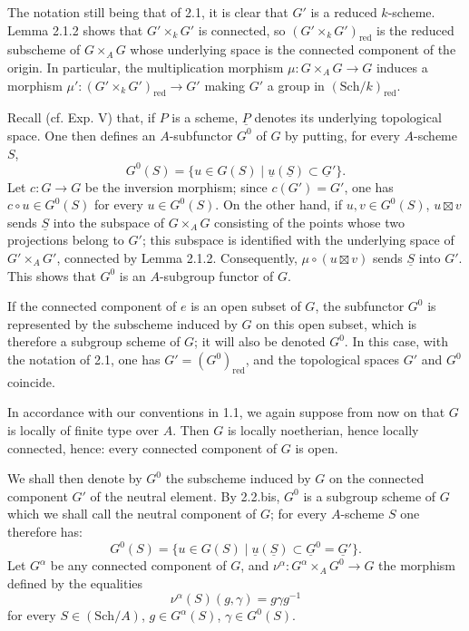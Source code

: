 The notation still being that of 2.1, it is clear that $G'$ is a reduced $k$-scheme. Lemma 2.1.2 shows that $G'\times_kG'$ is connected, so $(G'\times_kG')_{\mathrm{red}}$ is the reduced subscheme of $G\times_AG$ whose underlying space is the connected component of the origin. In particular, the multiplication morphism $\mu:G\times_AG\to G$ induces a morphism $\mu':(G'\times_kG')_{\mathrm{red}}\to G'$ making $G'$ a group in $(\mathrm{Sch}/k)_{\mathrm{red}}$.

Recall (cf. Exp. V) that, if $P$ is a scheme, $\underline P$ denotes its underlying topological space. One then defines an $A$-subfunctor $G^0$ of $G$ by putting, for every $A$-scheme $S$,
\[
G^0(S)=\{u\in G(S)\mid\underline u(\underline S)\subset\underline G'\}.
\]
Let $c:G\to G$ be the inversion morphism; since $c(G')=G'$, one has $c\circ u\in G^0(S)$ for every $u\in G^0(S)$. On the other hand, if $u,v\in G^0(S)$, $u\boxtimes v$ sends $\underline S$ into the subspace of $G\times_AG$ consisting of the points whose two projections belong to $G'$; this subspace is identified with the underlying space of $G'\times_AG'$, connected by Lemma 2.1.2. Consequently, $\mu\circ(u\boxtimes v)$ sends $\underline S$ into $G'$. This shows that $G^0$ is an $A$-subgroup functor of $G$.

If the connected component of $e$ is an open subset of $G$, the subfunctor $G^0$ is represented by the subscheme induced by $G$ on this open subset, which is therefore a subgroup scheme of $G$; it will also be denoted $G^0$. In this case, with the notation of 2.1, one has $G'=(G^0)_{\mathrm{red}}$, and the topological spaces $G'$ and $G^0$ coincide.

In accordance with our conventions in 1.1, we again suppose from now on that $G$ is locally of finite type over $A$. Then $G$ is locally noetherian, hence locally connected, hence: every connected component of $G$ is open.

We shall then denote by $G^0$ the subscheme induced by $G$ on the connected component $G'$ of the neutral element. By 2.2.bis, $G^0$ is a subgroup scheme of $G$ which we shall call the neutral component of $G$; for every $A$-scheme $S$ one therefore has:
\[
G^0(S)=\{u\in G(S)\mid\underline u(\underline S)\subset\underline G^0=\underline G'\}.
\]
Let $G^\alpha$ be any connected component of $G$, and $\nu^\alpha:G^\alpha\times_AG^0\to G$ the morphism defined by the equalities
\[
\nu^\alpha(S)(g,\gamma)=g\gamma g^{-1}
\]
for every $S\in(\mathrm{Sch}/A)$, $g\in G^\alpha(S)$, $\gamma\in G^0(S)$.

